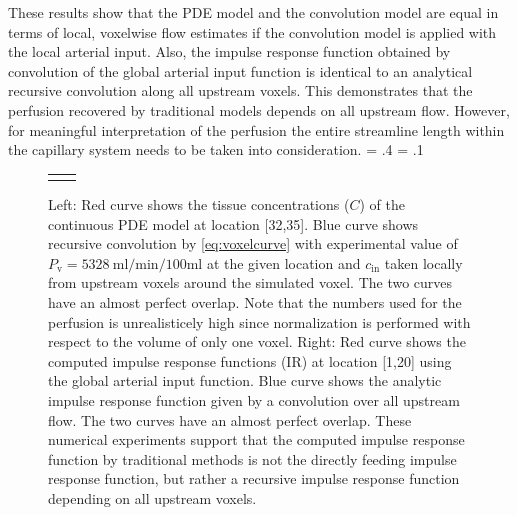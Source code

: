 \documentclass[final,5p,times,twocolumn]{elsarticle}
\begin{document}
These results show that the PDE model and the convolution model are equal in terms of local, voxelwise flow estimates if the convolution model is applied with the local arterial input. 
Also, the impulse response function obtained by convolution of the global arterial input function is identical to an analytical recursive convolution along all upstream voxels. 
This demonstrates that the perfusion recovered by traditional models depends on all upstream flow.
However, for meaningful interpretation of the perfusion the entire streamline length within the capillary system needs to be taken into consideration.
	\fwd = .4\textwidth
	\fht = .1\textheight	
	\begin{figure}
		{
		\small
		\begin{tabular}{c c}
			 & \\
		\end{tabular}
		}
		\caption{Left: Red curve shows the tissue concentrations ($C$) of the continuous PDE model at location [32,35]. Blue curve shows recursive convolution by \eqref{eq:voxelcurve} with experimental value of $P_{\mathrm{v}}=\SI{5328}{\milli\litre\per\minute\per100\milli\litre}$ at the given location and $c_{\mathrm{in}}$ taken locally from upstream voxels around the simulated voxel. The two curves have an almost perfect overlap. Note that the numbers used for the perfusion is unrealisticely high since normalization is performed with respect to the volume of only one voxel. Right: Red curve shows the computed impulse response functions (IR) at location [1,20] using the global arterial input function. Blue curve shows the analytic impulse response function given by a convolution over all upstream flow. The two curves have an almost perfect overlap. These numerical experiments support that the computed impulse response function by traditional methods is not the directly feeding impulse response function, but rather a recursive impulse response function depending on all upstream voxels.}\label{fig:VoxelComp}
	\end{figure}


\end{document}
